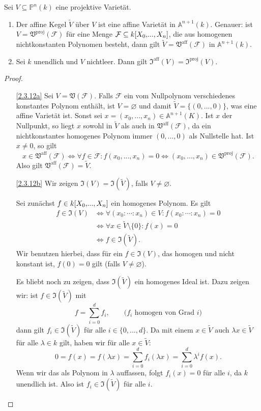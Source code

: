 \documentclass[a4paper,12pt]{scrbook}
\newtheorem{proof}{Beweis}
\def\A{\mathbb{A}}
\def\V{\mathfrak{V}}
\def\I{\mathfrak{I}}
\def\P{\mathbb{P}}
\newcommand{\F}{\mathcal{F}}
\newcommand{\leer}{\ensuremath{\varnothing}}
\renewcommand{\dotsc}{\ensuremath{\!...}}
\newcommand{\ppolyx}[1][n]{\ensuremath%
  [X_{0},\dotsc,X_{#1}]}
\begin{document}
\begin{prop}\label{2.3.12prop}
  Sei $V\subseteq\P^n(k)$ eine projektive Varietät.
  \begin{enumerate}
  \item{} Der affine Kegel $\tilde{V}$ über $V$ ist eine affine Varietät in $\A^{n+1}(k)$. Genauer: ist
    $V=\V^{\mathrm{proj}}(\F)$ für eine Menge $\F\subseteq k\ppolyx$, die aus homogenen nichtkonstanten Polynomen besteht, dann
    gilt $\tilde{V}=\V^{\mathrm{aff}}(\F)$ in $\A^{n+1}(k)$.
  \item{} Sei $k$ unendlich und $V$ nichtleer. Dann gilt $\I^{\mathrm{aff}}(V)=\I^{\mathrm{proj}}(V)$.
  \end{enumerate}
\end{prop}
\begin{proof}
  \begin{enumerate}
  \item[\ref{2.3.12a}] Sei $V=\V(\F)$. Falls $\F$ ein vom Nullpolynom verschiedenes konstantes Polynom enthält, ist $V=\leer$
    und damit $\tilde{V}=\{(0,\dotsc,0)\}$, was eine affine Varietät ist. Sonst sei $x=(x_0,\dotsc,x_n)\in\A^{n+1}(K)$. Ist $x$
    der Nullpunkt, so liegt $x$ sowohl in $\tilde{V}$ als auch in $\V^{\mathrm{aff}}(\F)$, da ein nichtkonstantes homogenes
    Polynom immer $(0,\dotsc,0)$ als Nullstelle hat. Ist $x\neq0$, so gilt
    \[ x\in\V^{\mathrm{aff}}(\F) \iff \forall f\in\F\colon f(x_0,\dotsc,x_n)=0 \iff
    (x_0,\dotsc,x_n)\in\V^{\mathrm{proj}}(\F). \]
    Also gilt $\V^{\mathrm{aff}}(\F)=\tilde{V}$.
  \item[\ref{2.3.12b}] Wir zeigen $\I(V)=\I(\tilde{V})$, falls $V\neq\leer$.

    Sei zunächst $f\in k\ppolyx$ ein homogenes Polynom. Es gilt
    \begin{align*}
      f\in\I(V) &\iff \forall (x_0:\dotsm:x_n)\in V\colon f(x_0:\dotsm:x_n)=0 \\ &\iff \forall x\in\tilde{V}\setminus\{0\}\colon
      f(x)=0 \\ &\iff f\in\I(\tilde{V}).
    \end{align*}
    Wir benutzen hierbei, dass für ein $f\in\I(V)$, das homogen und nicht konstant ist, $f(0)=0$ gilt (falls $V\neq\leer$).

    Es bliebt noch zu zeigen, dass $\I(\tilde{V})$ ein homogenes Ideal ist. Dazu zeigen wir: ist $f\in\I(\tilde{V})$ mit
    \[ f=\sum_{i=0}^d f_i, \qquad \text{(}f_i\text{ homogen von Grad }i\text{)} \] dann gilt $f_i\in\I(\tilde{V})$ für alle
    $i\in\{0,\dotsc,d\}$. Da mit einem $x\in\tilde{V}$ auch $\lambda x\in\tilde{V}$ für alle $\lambda\in k$ gilt, haben wir für
    alle $x\in\tilde{V}$: \[ 0=f(x)=f(\lambda x)=\sum_{i=0}^d f_i(\lambda x) = \sum_{i=0}^d \lambda^i f(x). \] Wenn wir das als
    Polynom in $\lambda$ auffassen, folgt $f_i(x)=0$ für alle $i$, da $k$ unendlich ist. Also ist $f_i\in\I(\tilde{V})$ für alle $i$.
  \end{enumerate}
\end{proof}
\end{document}
